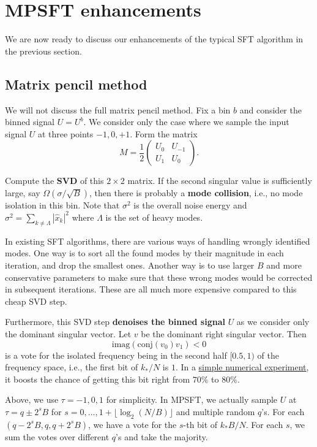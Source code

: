 \documentclass[10pt]{article}
\begin{document}
\section{MPSFT enhancements}

We are now ready to discuss our enhancements of the typical SFT algorithm in the previous section.

\subsection{Matrix pencil method}
We will not discuss the full matrix pencil method. Fix a bin $b$ and consider the binned signal $U=U^b$. We consider only the case where we sample the input signal $U$ at three points $-1, 0, +1$. Form the matrix
$$M = \frac{1}{2} \left( \begin{array}{cc}
U_0 & U_{-1} \\
U_{1} & U_0
\end{array} \right).$$

Compute the \textbf{SVD} of this $2\times 2$ matrix. If the second singular value is sufficiently large, say $\Omega(\sigma/\sqrt{B})$, then there is probably a \textbf{mode collision}, i.e., no mode isolation in this bin. Note that $\sigma^2$ is the overall noise energy and $\sigma^2= \sum_{k\neq \Lambda} |\hat{x}_k|^2$ where $\Lambda$ is the set of heavy modes.

In existing SFT algorithms, there are various ways of handling wrongly identified modes. One way is to sort all the found modes by their magnitude in each iteration, and drop the smallest ones. Another way is to use larger $B$ and more conservative parameters to make sure that these wrong modes would be corrected in subsequent iterations. These are all much more expensive compared to this cheap SVD step.

Furthermore, this SVD step \textbf{denoises the binned signal} $U$ as we consider only the dominant singular vector. Let $v$ be the dominant right singular vector. Then $$\text{imag}(\text{conj}(v_0)v_1)<0$$ is a vote for the isolated frequency being in the second half $[0.5,1)$ of the frequency space, i.e., the first bit of $k_*/N$ is $1$. In a \href{https://github.com/tinkerstash/mpsft/blob/master/notebook/Mode%20identification.ipynb}{simple numerical experiment}, it boosts the chance of getting this bit right from $70\%$ to $80\%$.

Above, we use $\tau=-1,0,1$ for simplicity. In MPSFT, we actually sample $U$ at $\tau=q \pm 2^s B$ for $s=0,\ldots,1 + \lfloor \log_2 (N/B) \rfloor$ and multiple random $q$'s. For each $(q-2^s B, q, q+2^s B)$, we have a vote for the $s$-th bit of $k_* B/N$. For each $s$, we sum the votes over different $q$'s and take the majority.
\end{document}
